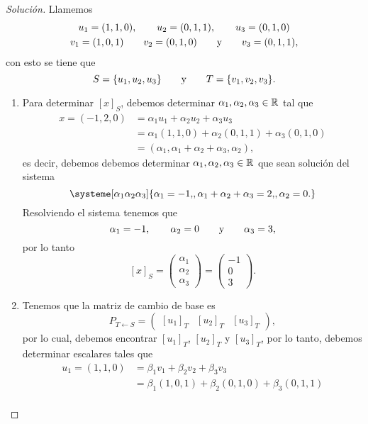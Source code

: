 \documentclass[a4,11pt]{aleph-notas}
\begin{document}
\begin{proof}[Solución]
Llamemos
\begin{gather*}
    u_1 = (1,1,0),\qquad
    u_2 = (0,1,1),\qquad
    u_3 = (0,1,0)\\
    v_1 = (1,0,1)\qquad
    v_2 = (0,1,0)\qquad\text{y}\qquad
    v_3 = (0,1,1),
\end{gather*}
con esto se tiene que
\[
    S = \{u_1,u_2,u_3\}
    \qquad\text{y}\qquad
    T = \{v_1,v_2,v_3\}.
\]
\begin{enumerate}[leftmargin=*]
\item 
    Para determinar $[x]_S$, debemos determinar $\alpha_1,\alpha_2,\alpha_3\in\mathbb{R}$ tal que 
    \begin{align*}
        x = (-1,2,0) & = \alpha_1 u_1+\alpha_2u_2+\alpha_3u_3 \\
        & = \alpha_1 (1,1,0)+\alpha_2(0,1,1)+\alpha_3(0,1,0)\\
        & = (\alpha_1,\alpha_1+\alpha_2+\alpha_3,\alpha_2),
    \end{align*}
    es decir, debemos debemos determinar $\alpha_1,\alpha_2,\alpha_3\in\mathbb{R}$ que sean solución del sistema
    \[
        \systeme[\alpha_1\alpha_2\alpha_3]{
        \alpha_1 = -1{,},
        \alpha_1+\alpha_2+\alpha_3 = 2{,},
        \alpha_2 = 0{.}
        }
    \]
    Resolviendo el sistema tenemos que
    \[
        \alpha_1 = -1,\qquad
        \alpha_2 = 0\qquad\text{y}\qquad
        \alpha_3 = 3,
    \]
    por lo tanto
    \[
        [x]_S 
        = \begin{pmatrix} \alpha_1\\ \alpha_2 \\ \alpha_3 \end{pmatrix}
        = \begin{pmatrix} -1\\ 0 \\ 3 \end{pmatrix}.
    \]
\item
    Tenemos que la matriz de cambio de base es 
    \[
        P_{T\leftarrow S} = 
        \begin{pmatrix}
        [u_1]_T & [u_2]_T & [u_3]_T
        \end{pmatrix},
    \]
    por lo cual, debemos encontrar $[u_1]_T$, $[u_2]_T$ y $[u_3]_T$, por lo tanto, debemos determinar escalares tales que
    \begin{align*}
        u_1 = (1,1,0) 
        & = \beta_1 v_1+\beta_2v_2+\beta_3v_3 \\
        & = \beta_1 (1,0,1) +\beta_2(0,1,0) +\beta_3(0,1,1)\\

\end{align*}
\end{enumerate}
\end{proof}
\end{document}
